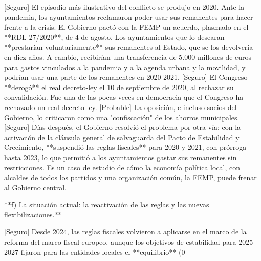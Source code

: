 \documentclass[10pt,a4paper]{article}
\begin{document}
[Seguro] El episodio más ilustrativo del conflicto se produjo en 2020. Ante la pandemia, los ayuntamientos reclamaron poder usar sus remanentes para hacer frente a la crisis. El Gobierno pactó con la FEMP un acuerdo, plasmado en el **RDL 27/2020**, de 4 de agosto. Los ayuntamientos que lo desearan **prestarían voluntariamente** sus remanentes al Estado, que se los devolvería en diez años. A cambio, recibirían una transferencia de 5.000 millones de euros para gastos vinculados a la pandemia y a la agenda urbana y la movilidad, y podrían usar una parte de los remanentes en 2020-2021. [Seguro] El Congreso **derogó** el real decreto-ley el 10 de septiembre de 2020, al rechazar su convalidación. Fue una de las pocas veces en democracia que el Congreso ha rechazado un real decreto-ley. [Probable] La oposición, e incluso socios del Gobierno, lo criticaron como una "confiscación" de los ahorros municipales. [Seguro] Días después, el Gobierno resolvió el problema por otra vía: con la activación de la cláusula general de salvaguarda del Pacto de Estabilidad y Crecimiento, **suspendió las reglas fiscales** para 2020 y 2021, con prórroga hasta 2023, lo que permitió a los ayuntamientos gastar sus remanentes sin restricciones. Es un caso de estudio de cómo la economía política local, con alcaldes de todos los partidos y una organización común, la FEMP, puede frenar al Gobierno central.

**f) La situación actual: la reactivación de las reglas y las nuevas flexibilizaciones.**

[Seguro] Desde 2024, las reglas fiscales volvieron a aplicarse en el marco de la reforma del marco fiscal europeo, aunque los objetivos de estabilidad para 2025-2027 fijaron para las entidades locales el **equilibrio** (0%
\end{document}
